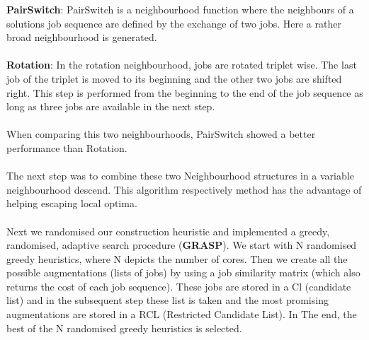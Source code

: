 \documentclass[12pt]{article}
\begin{document}
\textbf{PairSwitch}:  PairSwitch is a neighbourhood function where the neighbours of a solutions
job sequence are defined by the exchange of two jobs. Here a rather broad neighbourhood
is generated.
\\
\\
\textbf{Rotation}: In the rotation neighbourhood, jobs are rotated triplet wise. The last job 
of the triplet is moved to its beginning and the other two jobs are shifted right.
This step is performed from the beginning to the end of the job sequence as long as
three jobs are available in the next step.
\\
\\
When comparing this two neighbourhoods, PairSwitch showed a better performance than 
Rotation. 
\\
\\
The next step was to combine these two Neighbourhood structures in a variable
neighbourhood descend. This algorithm respectively method has the advantage of
helping escaping local optima. 
\\
\\
Next we randomised our construction heuristic and implemented a greedy, randomised, 
adaptive search procedure (\textbf{GRASP}). We start with N randomised greedy heuristics, where N 
depicts the number of cores. Then we create all the possible augmentations (lists
of jobs) by using a job similarity matrix (which also returns the cost of each
job sequence). These jobs are stored in a Cl (candidate list) and in the subsequent
step these list is taken and the most promising augmentations are stored in a RCL
(Restricted Candidate List). In The end, the best of the N randomised greedy heuristics
is selected.
\end{document}
